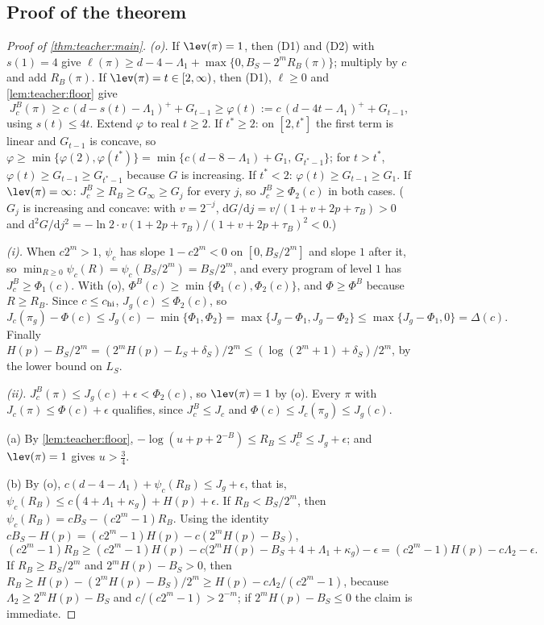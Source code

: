 \subsection{Proof of the theorem}\label{app:teacher:main}

\begin{proof}[Proof of \cref{thm:teacher:main}]
\emph{(o).} If $\lev(\pi)=1$, then (D1) and (D2) with $s(1)=4$ give $\ell(\pi)\ge d-4-\Lambda_1+\max\{0,B_S-2^mR_B(\pi)\}$; multiply by $c$ and add $R_B(\pi)$. If $\lev(\pi)=t\in[2,\infty)$, then (D1), $\ell\ge0$ and \cref{lem:teacher:floor} give
\[
J^B_c(\pi)\ge c\,(d-s(t)-\Lambda_1)^++G_{t-1}\ge\varphi(t):=c\,(d-4t-\Lambda_1)^++G_{t-1},
\]
using $s(t)\le4t$. Extend $\varphi$ to real $t\ge2$. If $t^*\ge2$: on $[2,t^*]$ the first term is linear and $G_{t-1}$ is concave, so $\varphi\ge\min\{\varphi(2),\varphi(t^*)\}=\min\{c(d-8-\Lambda_1)+G_1,\,G_{t^*-1}\}$; for $t>t^*$, $\varphi(t)\ge G_{t-1}\ge G_{t^*-1}$ because $G$ is increasing. If $t^*<2$: $\varphi(t)\ge G_{t-1}\ge G_1$. If $\lev(\pi)=\infty$: $J^B_c\ge R_B\ge G_\infty\ge G_j$ for every $j$, so $J^B_c\ge\Phi_2(c)$ in both cases. ($G_j$ is increasing and concave: with $v=2^{-j}$, $\mathrm dG/\mathrm dj=v/(1+v+2p+\tau_B)>0$ and $\mathrm d^2G/\mathrm dj^2=-\ln2\cdot v(1+2p+\tau_B)/(1+v+2p+\tau_B)^2<0$.)

\emph{(i).} When $c2^m>1$, $\psi_c$ has slope $1-c2^m<0$ on $[0,B_S/2^m]$ and slope $1$ after it, so $\min_{R\ge0}\psi_c(R)=\psi_c(B_S/2^m)=B_S/2^m$, and every program of level $1$ has $J^B_c\ge\Phi_1(c)$. With (o), $\Phi^B(c)\ge\min\{\Phi_1(c),\Phi_2(c)\}$, and $\Phi\ge\Phi^B$ because $R\ge R_B$. Since $c\le c_{\rm hi}$, $J_g(c)\le\Phi_2(c)$, so
\[
J_c(\pi_g)-\Phi(c)\le J_g(c)-\min\{\Phi_1,\Phi_2\}=\max\{J_g-\Phi_1,J_g-\Phi_2\}\le\max\{J_g-\Phi_1,0\}=\Delta(c).
\]
Finally $H(p)-B_S/2^m=(2^mH(p)-L_S+\delta_S)/2^m\le(\log(2^m+1)+\delta_S)/2^m$, by the lower bound on $L_S$.

\emph{(ii).} $J^B_c(\pi)\le J_g(c)+\epsilon<\Phi_2(c)$, so $\lev(\pi)=1$ by (o). Every $\pi$ with $J_c(\pi)\le\Phi(c)+\epsilon$ qualifies, since $J^B_c\le J_c$ and $\Phi(c)\le J_c(\pi_g)\le J_g(c)$.

(a) By \cref{lem:teacher:floor}, $-\log(u+p+2^{-B})\le R_B\le J^B_c\le J_g+\epsilon$; and $\lev(\pi)=1$ gives $u>\frac34$.

(b) By (o), $c(d-4-\Lambda_1)+\psi_c(R_B)\le J_g+\epsilon$, that is, $\psi_c(R_B)\le c(4+\Lambda_1+\kappa_g)+H(p)+\epsilon$. If $R_B<B_S/2^m$, then $\psi_c(R_B)=cB_S-(c2^m-1)R_B$. Using the identity $cB_S-H(p)=(c2^m-1)H(p)-c(2^mH(p)-B_S)$,
\[
(c2^m-1)R_B\ge(c2^m-1)H(p)-c\big(2^mH(p)-B_S+4+\Lambda_1+\kappa_g\big)-\epsilon=(c2^m-1)H(p)-c\Lambda_2-\epsilon.
\]
If $R_B\ge B_S/2^m$ and $2^mH(p)-B_S>0$, then $R_B\ge H(p)-(2^mH(p)-B_S)/2^m\ge H(p)-c\Lambda_2/(c2^m-1)$, because $\Lambda_2\ge2^mH(p)-B_S$ and $c/(c2^m-1)>2^{-m}$; if $2^mH(p)-B_S\le0$ the claim is immediate.


\end{proof}
